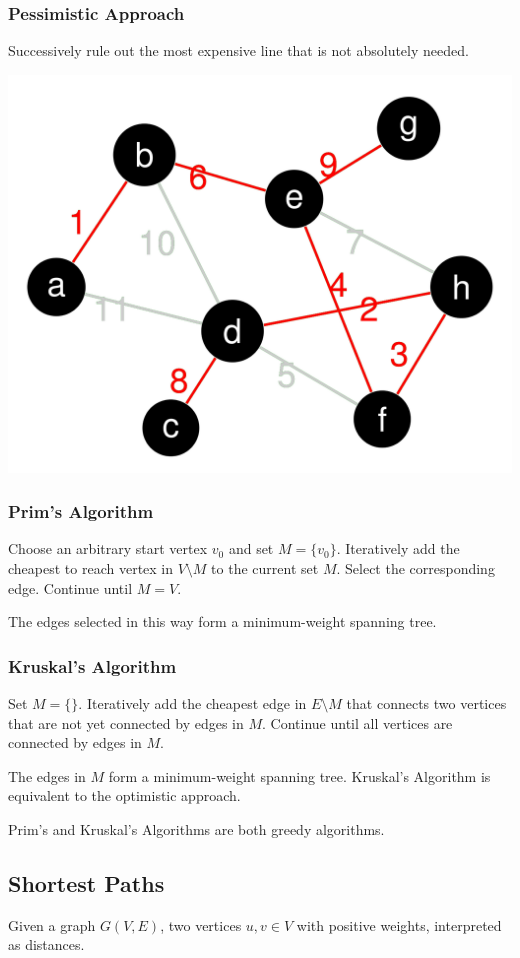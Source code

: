 \documentclass[11pt]{article}
\begin{document}
\subsubsection{Pessimistic Approach}
Successively rule out the most expensive line that is not absolutely needed.

\begin{center}
	\includegraphics[width=0.6\linewidth]{spanning_tree_pessimistic}
\end{center}

\subsubsection{Prim's Algorithm}
Choose an arbitrary start vertex $v_0$ and set $M = \{v_0\}$. Iteratively add the cheapest to reach vertex in $V\setminus M$ to the current set $M$. Select the corresponding edge. Continue until $M = V$.

The edges selected in this way form a minimum-weight spanning tree.

\subsubsection{Kruskal's Algorithm}

Set $M= \{\}$. Iteratively add the cheapest edge in $E\setminus M$ that connects two vertices that are not yet connected by edges in $M$. Continue until all vertices are connected by edges in $M$.

The edges in $M$ form a minimum-weight spanning tree. Kruskal's Algorithm is equivalent to the optimistic approach.

Prim's and Kruskal's Algorithms are both greedy algorithms.

\subsection{Shortest Paths}
Given a graph $G(V,E)$, two vertices $u,v\in V$ with positive weights, interpreted as distances.
\end{document}
